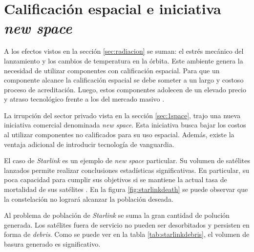 \newpage

\section{Calificación espacial e iniciativa \emph{new space}}
\label{sec:newspace}

A los efectos vistos en la sección \ref{sec:radiacion} se suman: el estrés mecánico del lanzamiento y los cambios de temperatura en la órbita.
Este ambiente genera la necesidad de utilizar componentes con calificación espacial.
Para que un componente alcance la calificación espacial se debe someter a un largo y costoso proceso de acreditación.
Luego, estos componentes adolecen de un elevado precio y atraso tecnológico frente a los del mercado masivo \citep{ARTICLE:negocio}.

La irrupción del sector privado vista en la sección \ref{sec:1space}, trajo una nueva iniciativa comercial denominada \emph{new space}.
Esta iniciativa busca bajar los costos al utilizar componentes no calificados para su uso espacial.
Además, existe la ventaja adicional de introducir tecnología de vanguardia.


El caso de \emph{Starlink} es un ejemplo de \emph{new space} particular.
Su volumen de satélites lanzados permite realizar conclusiones estadísticas significativas.
En particular, su poca capacidad para cumplir sus objetivos si se mantiene la actual tasa de mortalidad de sus satélites \citep{ARTICLE:cibils}.
En la figura \ref{fig:starlinkdeath} se puede observar que la constelación no logrará alcanzar la población deseada.
 
Al problema de población de \emph{Starlink} se suma la gran cantidad de polución generada.
Los satélites fuera de servicio no pueden ser desorbitados y persisten en forma de \emph{debris}.
Como se puede ver en la tabla \ref{tab:starlinkdebris}, el volumen de basura generado es significativo.


